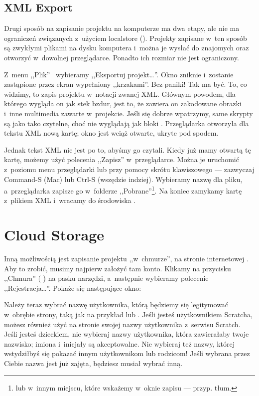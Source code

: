 \documentclass[a4paper]{report}
\begin{document}
{\Huge \TODO{}}

\subsection{XML Export}

Drugi sposób na zapisanie projektu na komputerze ma dwa etapy, ale nie ma ograniczeń związanych z~użyciem localstore (). Projekty zapisane w~ten sposób są zwykłymi plikami na dysku komputera i~można je wysłać do znajomych oraz otworzyć w~dowolnej przeglądarce. Ponadto ich rozmiar nie jest ograniczony.

Z~menu ,,Plik''~ wybieramy ,,Eksportuj projekt\ldots''. Okno  zniknie i~zostanie zastąpione przez ekran wypełniony ,,krzakami''. Bez paniki! Tak ma być. To, co widzimy, to zapis projektu w~notacji zwanej XML. Głównym powodem, dla którego wygląda on jak stek bzdur, jest to, że zawiera on zakodowane obrazki i~inne multimedia zawarte w~projekcie. Jeśli się dobrze wpatrzymy, same skrypty są jako tako czytelne, choć nie wyglądają jak bloki . Przeglądarka otworzyła dla tekstu XML nową kartę; okno  jest wciąż otwarte, ukryte pod spodem.

Jednak tekst XML nie jest po to, abyśmy go czytali. Kiedy już mamy otwartą tę kartę, możemy użyć polecenia ,,Zapisz'' w~przeglądarce. Można je uruchomić z~poziomu menu przeglądarki lub przy pomocy skrótu klawiszowego --- zazwyczaj Command-S (Mac) lub Ctrl-S (wszędzie indziej). Wybieramy nazwę dla pliku, a~przeglądarka zapisze go w~folderze ,,Pobrane''\footnote{lub w~innym miejscu, które wskażemy w~oknie zapisu --- przyp. tłum.}. Na koniec zamykamy kartę z~plikiem XML i~wracamy do środowiska \Snap{}.

\section{Cloud Storage}

Inną możliwością jest zapisanie projektu ,,w~chmurze'', na stronie internetowej . Aby to zrobić, musimy najpierw założyć tam konto. Klikamy na przycisku ,,Chmura'' (\,\,) na pasku narzędzi, a~następnie wybieramy polecenie ,,Rejestracja\ldots''. Pokaże się następujące okno:\nopagebreak


Należy teraz wybrać nazwę użytkownika, którą będziemy się legitymować w~obrębie strony, taką jak na przykład  lub . Jeśli jesteś użytkownikiem Scratcha, możesz również użyć na stronie  swojej nazwy użytkownika z~serwisu Scratch. Jeśli jesteś dzieckiem, nie wybieraj nazwy użytkownika, która zawierałaby twoje nazwisko; imiona i~inicjały są akceptowalne. Nie wybieraj też nazwy, której wstydziłbyś się pokazać innym użytkownikom lub rodzicom! Jeśli wybrana przez Ciebie nazwa jest już zajęta, będziesz musiał wybrać inną.
\end{document}

